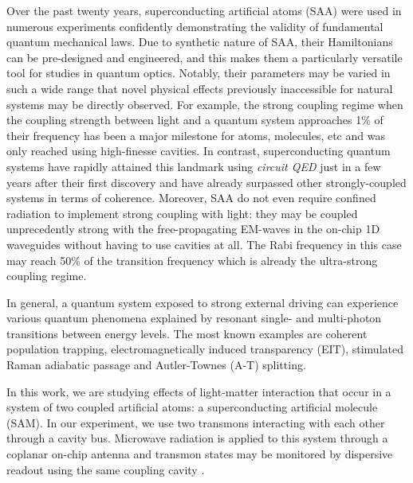 \documentclass[%
 aip,
 amsmath,amssymb,
 reprint,%
]{revtex4-1}
\begin{document}
Over the past twenty years, superconducting artificial atoms (SAA) were used in numerous experiments confidently demonstrating the validity of fundamental quantum mechanical laws\cite{you2011atomic}. Due to synthetic nature of SAA, their Hamiltonians can be pre-designed and engineered, and this makes them a particularly versatile tool for studies in quantum optics. Notably, their parameters may be varied in such a wide range that novel physical effects previously inaccessible for natural systems may be directly observed. For example, the strong coupling regime when the coupling strength between light and a quantum system approaches 1\% of their frequency has been a major milestone for atoms, molecules, etc and was only reached using high-finesse cavities. In contrast, superconducting quantum systems have rapidly attained this landmark using \textit{circuit QED}\cite{wallraff2004strong} just in a few years after their first discovery\cite{chiorescu2004coherent} and have already surpassed other strongly-coupled systems in terms of coherence\cite{forn2019ultrastrong}. 
Moreover, SAA do not even require confined radiation to implement strong coupling with light: they may be coupled unprecedently strong with the free-propagating EM-waves in the on-chip 1D waveguides\cite{astafiev2010resonance} without having to use cavities at all. The Rabi frequency in this case may reach 50\% of the transition frequency\cite{deng2015observation} which is already the ultra-strong coupling regime.

In general, a quantum system exposed to strong external driving can experience various quantum phenomena explained by resonant single- and multi-photon transitions between energy levels. The most known examples are coherent population trapping, electromagnetically induced transparency (EIT)\cite{boller1991observation}, stimulated Raman adiabatic passage\cite{bergmann1998coherent} and Autler-Townes (A-T) splitting\cite{autler1955stark}. 

In this work, we are studying effects of light-matter interaction that occur in a system of two coupled artificial atoms: a superconducting artificial molecule (SAM). In our experiment, we use two transmons\cite{koch2007charge} interacting with each other through a cavity bus\cite{majer2007coupling}. Microwave radiation is applied to this system through a coplanar on-chip antenna and transmon states may be monitored by dispersive readout using the same coupling cavity \cite{chow2010detecting}.
\end{document}
